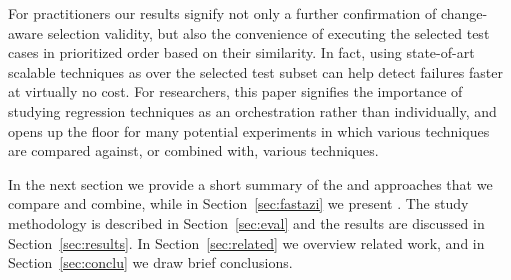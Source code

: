 For practitioners our results signify not only a further confirmation of change-aware selection validity, but also the convenience of executing the selected test cases in prioritized order based on their similarity.
In fact, using state-of-art scalable techniques as \fs over the selected test subset can help detect failures faster at virtually no cost.
For researchers, this paper signifies the importance of studying regression techniques as an orchestration rather than individually, and 
opens up the floor for many potential experiments in which various \tcs techniques are compared against, or combined with, various \tcp techniques. 

In the next section we provide a short summary of the \tcs and \tcp approaches that we compare and combine, while in Section~\ref{sec:fastazi} we present \fz. 
The study methodology is described in Section~\ref{sec:eval} and the results are discussed in Section~\ref{sec:results}.
In Section~\ref{sec:related} we overview related work, and in Section~\ref{sec:conclu} we draw brief conclusions. 
